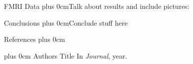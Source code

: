 \documentclass[final,hyperref={pdfpagelabels=false}]{beamer}
\renewcommand{\raggedright}{\leftskip=0.5cm \rightskip=0.5cm plus 0cm}
\begin{document}
\begin{frame}{}
\begin{columns}[t]
\begin{column}{.48\linewidth}
        \begin{block}{\Large FMRI Data}
          \raggedright Talk about results and include pictures: \vskip5cm
          \vskip5.5cm
        \end{block}

        \begin{block}{\Large Conclusions}
          \raggedright Conclude stuff here
        \end{block}
        \begin{block}{References}
          \raggedright
          \footnotesize
          \begin{thebibliography}{2}
            \raggedright
            Authors
            \newblock Title
            \newblock In \emph{Journal}, year.
          \end{thebibliography}
        \end{block}
      \end{column}
    \end{columns}
  \end{frame}
\end{document}
